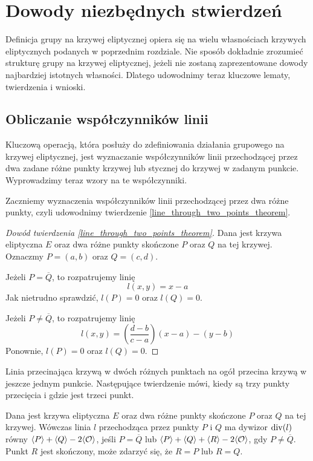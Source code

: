 \section{Dowody niezbędnych stwierdzeń}

Definicja grupy na krzywej eliptycznej
opiera się na wielu własnościach krzywych eliptycznych
podanych w poprzednim rozdziale.
Nie sposób dokładnie zrozumieć strukturę grupy na krzywej eliptycznej,
jeżeli nie zostaną zaprezentowane dowody najbardziej istotnych własności.
Dlatego udowodnimy teraz kluczowe lematy, twierdzenia i wnioski.

\subsection*{Obliczanie współczynników linii}

Kluczową operacją, która posłuży do zdefiniowania działania grupowego
na krzywej eliptycznej,
jest wyznaczanie współczynników
linii przechodzącej przez dwa zadane różne punkty krzywej
lub stycznej do krzywej w zadanym punkcie.
Wyprowadzimy teraz wzory na te współczynniki.

Zaczniemy wyznaczenia współczynników
linii przechodzącej przez dwa różne punkty,
czyli udowodnimy twierdzenie \ref{line_through_two_points_theorem}.

\begin{proof}[Dowód twierdzenia \ref{line_through_two_points_theorem}]
Dana jest krzywa eliptyczna $E$
oraz dwa różne punkty skończone $P$ oraz $Q$ na tej krzywej.
Oznaczmy $P = (a, b)$ oraz $Q = (c, d)$.

Jeżeli $P = \overline{Q}$,
to rozpatrujemy linię
\begin{equation*}
l(x, y) = x - a
\end{equation*}
Jak nietrudno sprawdzić, $l(P) = 0$ oraz $l(Q) = 0$.

Jeżeli $P \neq \overline{Q}$,
to rozpatrujemy linię
\begin{equation*}
l(x, y) = \left(\frac{d-b}{c-a}\right)(x - a) - (y - b)
\end{equation*}
Ponownie, $l(P) = 0$ oraz $l(Q) = 0$.
\end{proof}

Linia przecinająca krzywą w dwóch różnych punktach
na ogół przecina krzywą w jeszcze jednym punkcie.
Następujące twierdzenie mówi,
kiedy są trzy punkty przecięcia
i gdzie jest trzeci punkt.

\begin{theorem}
Dana jest krzywa eliptyczna $E$
oraz dwa różne punkty skończone $P$ oraz $Q$ na tej krzywej.
Wówczas linia $l$ przechodząca przez punkty $P$ i $Q$
ma dywizor $\operatorname{div}(l)$ równy $\langle P\rangle + \langle Q\rangle - 2\langle\mathcal{O}\rangle$,
jeśli $P = \overline{Q}$
lub $\langle P\rangle + \langle Q\rangle + \langle R\rangle - 2\langle\mathcal{O}\rangle$,
gdy $P \neq \overline{Q}$.
Punkt $R$ jest skończony,
może zdarzyć się, że $R = P$ lub $R = Q$.
\end{theorem}

